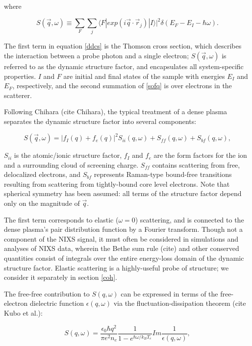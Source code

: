 \documentclass [11pt, proquest, article] {uwthesis}[2016/11/22]
\begin{document}
where 


\label{sofq}
\begin{equation}
S(\vec{q}, \omega) \equiv \sum_F  \sum_j\langle F|  exp(i \vec{q} \cdot \vec{r}_j) |I\rangle |^2 \delta(E_F - E_I - \hbar \omega).
\end{equation}

The first term in equation \ref{ddcs} is the Thomson cross section, which describes the interaction between a probe photon and a single electron; $S(\vec{q}, \omega)$ is referred to as the dynamic structure factor, and encapsulates all system-specific properties. $I$ and $F$ are initial and final states of the sample with energies $E_I$ and $E_F$, respectively, and the second summation of \ref{sofq} is over electrons in the scatterer.

Following Chihara (cite Chihara), the typical treatment of a dense plasma separates the dynamic structure factor into several components:

\begin{equation}
S(\vec{q}, \omega) = |f_I(q) + f_e(q)|^2 S_{ii}(q, \omega) + S_{ff}(q, \omega) + S_{bf}(q, \omega),
\end{equation}

$S_{ii}$ is the atomic/ionic structure factor, $f_I$ and $f_e$ are the form factors for the ion and a surrounding cloud of screening charge. $S_{ff}$ contains scattering from free, delocalized electrons, and $S_{bf}$ represents Raman-type bound-free transitions resulting from scattering from tightly-bound core level electrons. Note that spherical symmetry has been assumed: all terms of the structure factor depend only on the magnitude of $\vec{q}$.

The first term corresponds to elastic ($\omega = 0$) scattering, and is connected to the dense plasma's pair distribution function by a Fourier transform. Though not a component of the NIXS signal, it must often be considered in simulations and analyses of NIXS data, wherein the Bethe sum rule (cite) and other conserved quantities consist of integrals over the entire energy-loss domain of the dynamic structure factor. Elastic scattering is a highly-useful probe of structure; we consider it separately in section \ref{coh}. 

The free-free contribution to $S(q, \omega)$ can be expressed in terms of the free-electron dielectric function $\epsilon(q, \omega)$  via the fluctuation-dissipation theorem (cite Kubo et al.):

\begin{equation}
S(q, \omega) = \frac{\epsilon_0 \hbar q^2}{\pi e^2 n_e} \frac{1}{1 - e^{\hbar \omega/k_B T_e}} Im\frac{1}{\epsilon(q, \omega)},
\end{equation}
\end{document}
